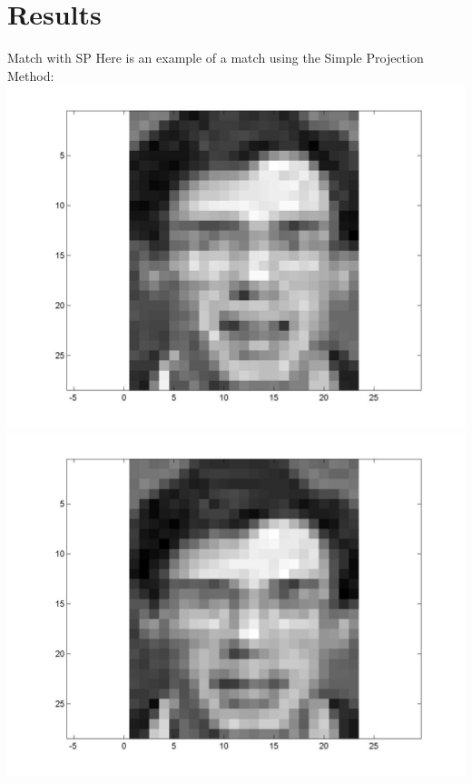 \documentclass[pdf]{beamer}
\begin{document}
\section{Results}
\begin{frame}{Match with SP}
Here is an example of a match using the Simple Projection Method:
\includegraphics[scale=.13]{figure2}
\includegraphics[scale=.13]{figure3}
\end{frame}
\end{document}
